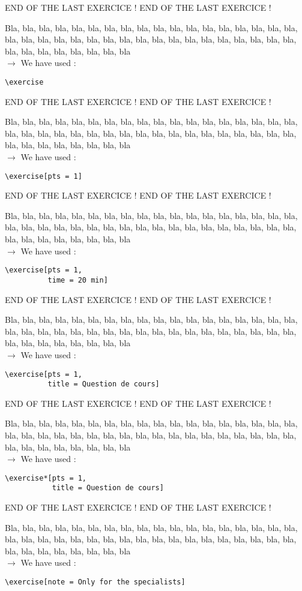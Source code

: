 \documentclass[12pt]{article}
\newcommand\blabla{%
		\noindent Bla, bla, bla, bla, bla, bla, bla, bla, bla, bla, bla,
		bla, bla, bla, bla, bla, bla, bla, bla, bla, bla, bla,
		bla, bla, bla, bla, bla, bla, bla, bla, bla, bla, bla,
		bla, bla, bla, bla, bla, bla, bla, bla, bla, bla, bla
	}
\newcommand\codeused{
		\blabla{} \medskip  \\ \noindent $\rightarrow$ We have used :
	}
\begin{document}
\newpage \medskip \noindent END OF THE LAST EXERCICE ! END OF THE LAST EXERCICE !

\exercise

\codeused{}
\begin{verbatim}
\exercise
\end{verbatim}



\newpage \medskip \noindent END OF THE LAST EXERCICE ! END OF THE LAST EXERCICE !

\exercise[pts = 1]

\codeused{}
\begin{verbatim}
\exercise[pts = 1]
\end{verbatim}



\newpage \medskip \noindent END OF THE LAST EXERCICE ! END OF THE LAST EXERCICE !

\exercise[pts = 1, time = 20 min]

\codeused{}
\begin{verbatim}
\exercise[pts = 1,
          time = 20 min]
\end{verbatim}



\newpage \medskip \noindent END OF THE LAST EXERCICE ! END OF THE LAST EXERCICE !

\exercise[pts = 1,
          title = Question de cours]

\codeused{}
\begin{verbatim}
\exercise[pts = 1,
          title = Question de cours]
\end{verbatim}



\newpage \medskip \noindent END OF THE LAST EXERCICE ! END OF THE LAST EXERCICE !

\exercise*[pts = 1,
           title = Question de cours]

\codeused{}
\begin{verbatim}
\exercise*[pts = 1,
           title = Question de cours]
\end{verbatim}



\newpage \medskip \noindent END OF THE LAST EXERCICE ! END OF THE LAST EXERCICE !

\exercise[note = Only for the specialists]

\codeused{}
\begin{verbatim}
\exercise[note = Only for the specialists]
\end{verbatim}
\end{document}
